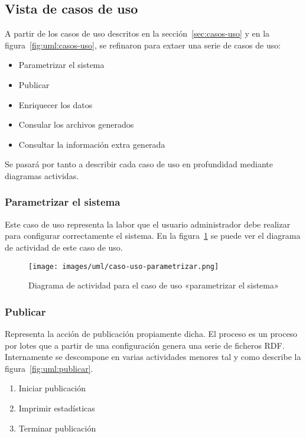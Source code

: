 
\subsection{Vista de casos de uso}

A partir de los casos de uso descritos en la sección~\ref{sec:casos-uso} y 
en la figura~\ref{fig:uml:casos-uso}, se refinaron para extaer una serie 
de casos de uso:

\begin{itemize}
 \item Parametrizar el sistema
 \item Publicar
 \item Enriquecer los datos
 \item Consular los archivos generados
 \item Consultar la información extra generada
\end{itemize}

Se pasará por tanto a describir cada caso de uso en profundidad mediante diagramas
actividas.

\subsubsection{Parametrizar el sistema}

Este caso de uso representa la labor que el usuario administrador debe realizar 
para configurar correctamente el sistema. En la figura~\ref{fig:uml:parametrizar-sistema}
se puede ver el diagrama de actividad de este caso de uso.

\begin{figure}[H]
 	\centering
	\texttt{[image: images/uml/caso-uso-parametrizar.png]}
	\caption{Diagrama de actividad para el caso de uso «parametrizar el sistema»}
	\label{fig:uml:parametrizar-sistema}
\end{figure}

\subsubsection{Publicar}

Representa la acción de publicación propiamente dicha. El proceso es un proceso por 
lotes que a partir de una configuración genera una serie de ficheros RDF. Internamente
se descompone en varias actividades menores tal y como describe la 
figura~\ref{fig:uml:publicar}.

\begin{enumerate}
 \item Iniciar publicación
 \item Imprimir estadísticas
 \item Terminar publicación
\end{enumerate}

